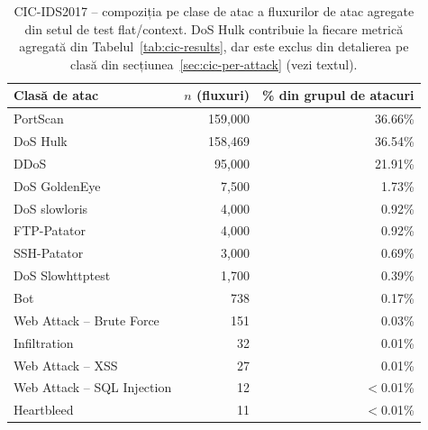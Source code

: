 \begin{table}[H]
\centering
\begin{tabular}{@{}lrr@{}}
\toprule
Clasă de atac & $n$ (fluxuri) & \% din grupul de atacuri \\
\midrule
PortScan            & 159{,}000 & 36.66\% \\
DoS Hulk            & 158{,}469 & 36.54\% \\
DDoS                & 95{,}000  & 21.91\% \\
DoS GoldenEye       & 7{,}500   & 1.73\%  \\
DoS slowloris       & 4{,}000   & 0.92\%  \\
FTP-Patator         & 4{,}000   & 0.92\%  \\
SSH-Patator         & 3{,}000   & 0.69\%  \\
DoS Slowhttptest    & 1{,}700   & 0.39\%  \\
Bot                 & 738       & 0.17\%  \\
Web Attack -- Brute Force & 151 & 0.03\%  \\
Infiltration        & 32        & 0.01\%  \\
Web Attack -- XSS    & 27        & 0.01\%  \\
Web Attack -- SQL Injection & 12 & $<$0.01\% \\
Heartbleed          & 11        & $<$0.01\% \\
\bottomrule
\end{tabular}
\caption{CIC-IDS2017 -- compoziția pe clase de atac a fluxurilor de atac agregate din setul de test flat/context. DoS Hulk contribuie la fiecare metrică agregată din Tabelul~\ref{tab:cic-results}, dar este exclus din detalierea pe clasă din secțiunea~\ref{sec:cic-per-attack} (vezi textul).}
\label{tab:cic-composition}
\end{table}

